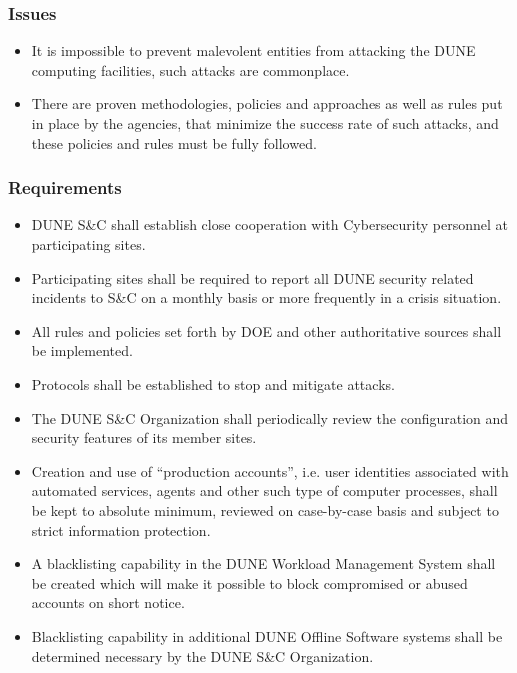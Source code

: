 \subsubsection{Issues}
\begin{itemize}
	\item It is impossible to prevent malevolent entities from attacking the DUNE computing facilities, such attacks are commonplace.
	
	\item There are proven methodologies, policies and approaches as well as rules put in place by the agencies, that minimize the success rate of such attacks, and these policies and rules must be fully followed.
\end{itemize}

\subsubsection{Requirements}
\begin{itemize}
	\item DUNE S\&C shall establish close cooperation with Cybersecurity personnel at participating sites.
	
	\item Participating sites shall be required to report all DUNE security related incidents to S\&C on a monthly basis or more frequently in a crisis situation.
	
	\item All rules and policies set forth by DOE and other authoritative sources shall be implemented.
	
	\item Protocols shall be established to stop and mitigate attacks.
	
	\item The DUNE S\&C Organization shall periodically review the configuration and security features of its member sites.
	
	\item Creation and use of ``production accounts'', i.e. user identities associated with automated services, agents and other such type of computer processes, shall be kept to absolute minimum, reviewed on case-by-case basis and subject to strict information protection.
	
	\item A blacklisting capability in the DUNE Workload Management System shall be created which will make it possible to block compromised or abused accounts on short notice.
	
	\item Blacklisting capability in additional DUNE Offline Software systems shall be determined necessary by the DUNE S\&C Organization.
	
\end{itemize}

